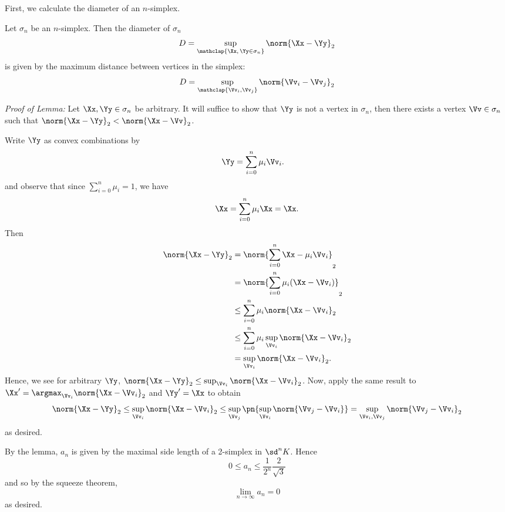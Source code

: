 \begin{solution}
  First, we calculate the diameter of an $n$-simplex.
  \begin{leftbar}
    \begin{lemma}
      Let $\sigma_n$ be an $n$-simplex. Then the diameter of $\sigma_n$
      \[
        D = \sup_{\mathclap{\Xx,\, \Yy \in \sigma_n}} \norm{\Xx - \Yy}_2
      \]
      is given by the maximum distance between vertices in the simplex:
      \[
        D = \sup_{\mathclap{\Vv_i, \Vv_j}} \norm{\Vv_i - \Vv_j}_2
      \]
    \end{lemma}

    \emph{Proof of Lemma:} Let $\Xx, \Yy \in \sigma_n$ be arbitrary. It will
    suffice to show that $\Yy$ is not a vertex in $\sigma_n$, then there exists
    a vertex $\Vv \in \sigma_n$ such that $\norm{\Xx - \Yy}_2 < \norm{\Xx -
      \Vv}_2$.

    Write $\Yy$ as convex combinations by
    \begin{align*}
      \Yy &= \sum_{i=0}^n \mu_i \Vv_i.
    \end{align*}
    and observe that since $\sum_{i=0}^n \mu_i = 1$, we have
    \[
      \Xx = \sum_{i=0}^n \mu_i \Xx = \Xx.
    \]
    Then
    \begin{align*}
      \norm{\Xx - \Yy}_2
      &= \norm{\sum_{i=0}^n \Xx - \mu_i\Vv_i}_2 \\
      &= \norm{\sum_{i=0}^n \mu_i(\Xx - \Vv_i)}_2 \\
      &\leq \sum_{i=0}^n \mu_i \norm{\Xx - \Vv_i}_2 \\
      &\leq \sum_{i=0}^n \mu_i \sup_{\Vv_i} \norm{\Xx - \Vv_i}_2 \\
      &= \sup_{\Vv_i} \norm{\Xx - \Vv_i}_2.
    \end{align*}
    Hence, we see for arbitrary $\Yy$, $\norm{\Xx - \Yy}_2 \leq \sup_{\Vv_i}
    \norm{\Xx - \Vv_i}_2$. Now, apply the same result to $\Xx' = \argmax_{\Vv_i}
    \norm{\Xx - \Vv_i}_2$ and $\Yy' = \Xx$ to obtain
    \[
      \norm{\Xx - \Yy}_2 \leq \sup_{\Vv_i} \norm{\Xx - \Vv_i}_2 \leq
      \sup_{\Vv_j}\pn{ \sup_{\Vv_i} \norm{\Vv_j - \Vv_i}} = \sup_{\Vv_i, \Vv_j}
      \norm{\Vv_j - \Vv_i}_2
    \]
    as desired.
  \end{leftbar}
  By the lemma, $a_n$ is given by the maximal side length of a 2-simplex in
  $\sd^n K$. Hence
  \[
    0 \leq a_n \leq \frac{1}{2^n} \frac{2}{\sqrt{3}}
  \]
  and so by the squeeze theorem,
  \[
    \lim_{n\to\infty} a_n = 0
  \]
  as desired.
\end{solution}
